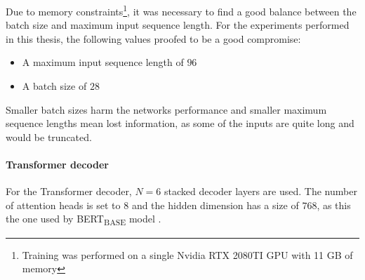 Due to memory constraints\footnote{Training was performed on a single Nvidia RTX 2080TI GPU with 11 GB of memory}, it was necessary to find a good balance between the batch size and maximum input sequence length.
For the experiments performed in this thesis, the following values proofed to be a good compromise:
\begin{itemize}
\item A maximum input sequence length of $96$
\item A batch size of $28$
\end{itemize}

Smaller batch sizes harm the networks performance and smaller maximum sequence lengths mean lost information, as some of the inputs are quite long and would be truncated.

\paragraph{Transformer decoder}

For the Transformer decoder, $N=6$ stacked decoder layers are used.
The number of attention heads is set to $8$ and the hidden dimension has a size of $768$, as this the one used by BERT\textsubscript{BASE} model \cite[p.~3]{devlin2018bert}.